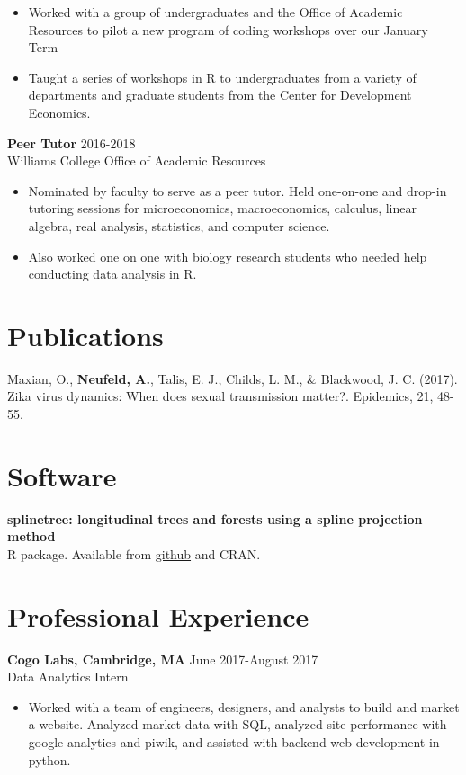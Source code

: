 \documentclass[margin, 10pt]{res} %
\begin{document}
\begin{resume}
{\begin{itemize}
\item Worked with a group of undergraduates and the Office of Academic Resources to pilot a new program of coding workshops over our January Term
\item Taught a series of workshops in R to undergraduates from a variety of departments and graduate students from the Center for Development Economics. 
\end{itemize}
{\textbf{Peer Tutor}} \hfill 2016-2018 \\
Williams College Office of Academic Resources
\begin{itemize}
\item Nominated by faculty to serve as a peer tutor. Held one-on-one and drop-in tutoring sessions for microeconomics, macroeconomics, calculus, linear algebra, real analysis, statistics, and computer science. 
\item Also worked one on one with biology research students who needed help conducting data analysis in R. 
\end{itemize}


\section{Publications} 
Maxian, O., \textbf{Neufeld, A.}, Talis, E. J., Childs, L. M., \& Blackwood, J. C. (2017). Zika virus dynamics: When does sexual transmission matter?. Epidemics, 21, 48-55.

 
\section{Software} 
\textbf{splinetree: longitudinal trees and forests using a spline projection method} \\
R package. Available from \href{https://github.com/anna-neufeld/splinetree}{github} and CRAN. 

\section{Professional Experience}
{\textbf{Cogo Labs, Cambridge, MA}} \hfill June 2017-August 2017 \\
Data Analytics Intern
\begin{itemize}
\item Worked with a team of engineers, designers, and analysts to build and market a website. Analyzed market data with SQL, analyzed site performance with google analytics and piwik, and assisted with backend web development in python. 
\end{itemize}

}
\end{resume}
\end{document}
